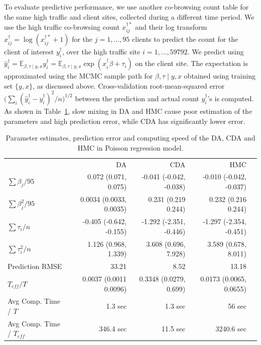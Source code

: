 \documentclass[twoside,11pt]{article}
\newcommand{\bb}[1]{\mathbb{#1}}
\newcommand{\1}{\mathbf 1}
\begin{document}
{To evaluate predictive performance, we use another co-browsing count table for the same high traffic and client sites, collected during a different time period. We use the high traffic co-browsing count $x_{ij}^{\dagger*}$ and their log transform 
$x^\dagger_{ij} = \log(   x_{ij}^{\dagger*} +1 )$ for the  $j = 1,\ldots,95$ clients to predict the count for the client of interest $y_i^\dagger$, over the high traffic site $i=1,\ldots, 59792$. We predict using $\hat y_i^\dagger= \bb E_{ \beta, \tau \mid y,x}   y_{i}^\dagger =\bb E_{ \beta, \tau \mid y,x}\exp(  x_{i}^\dagger\beta + \tau_i)$ on the client site. The expectation is approximated using the MCMC sample path for $\beta, \tau \mid y,x$ obtained using training set $\{y,x\}$, as discussed above. Cross-validation root-mean-squared error $\big(\sum_i(\hat y_i^\dagger - y_i^\dagger)^2/n\big)^{1/2}$ between the prediction and actual count $ y_i^\dagger$'s is computed. As shown in Table~\ref{table:Poisson}, slow mixing in DA and HMC cause poor estimation of the parameters and high prediction error, while CDA has significantly lower error. 
\begin{table}[H]
\footnotesize
\centering
\begin{tabular}{|l |r |r| r| r |} 
 \hline
                          & DA & CDA & HMC\\
 [0.5ex]
$\sum \beta_j / 95$         & 0.072 (0.071, 0.075)&  -0.041 (-0.042, -0.038)  & -0.010 (-0.042, -0.037) \\
$\sum \beta_j^2 / 95$         & 0.0034 (0.0033, 0.0035)&  0.231 (0.219 0.244)  & 0.232 (0.216 0.244)   \\
$\sum\tau_i/n$         & -0.405 (-0.642, -0.155)&  -1.292 (-2.351, -0.446)  &  -1.297 (-2.354, -0.451)  \\
$\sum\tau_i^2/n$         & 1.126 (0.968, 1.339)&  3.608 (0.696, 7.928)  & 3.589 (0.678, 8.011)  \\
Prediction RMSE                           & 33.21        & 8.52          & 13.18\\
$T_{eff} / T$ & 0.0037 (0.0011 0.0096) & 0.3348 (0.0279, 0.699) &  0.0173 (0.0065, 0.0655) \\
Avg Comp. Time /  $T$  & 1.3 sec       & 1.3 sec        & 56 sec\\
Avg Comp. Time /  $T_{eff}$  & 346.4 sec       & 11.5 sec        & 3240.6 sec\\
 \hline
\end{tabular}
\caption{Parameter estimates, prediction error and computing speed of the DA, CDA and HMC in Poisson regression model.}
\label{table:Poisson}
\end{table}

}
\end{document}
